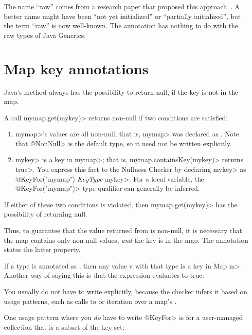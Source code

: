 The name ``raw'' comes from a research paper that proposed this
approach~\cite{FahndrichL2003}.
A better name might have been ``not yet initialized'' or ``partially
initialized'', but the term ``raw'' is now well-known.
The 
annotation has nothing to do with the raw types of Java Generics.


\section{Map key annotations\label{map-keys}}

Java's
method always has the possibility to return null, if the key is not in the
map.

A call \<mymap.get(mykey)> returns non-null if two conditions are satisfied:
\begin{enumerate}
\item \<mymap>'s values are all non-null; that is, \<mymap> was
  declared as .  Note
  that \<@NonNull> is the default type, so it need not be written explicitly.
\item \<mykey> is a key in \<mymap>; that is, \<mymap.containsKey(mykey)>
  returns \<true>.  You express this fact to the Nullness Checker by
  declaring \<mykey> as \<@KeyFor("mymap") \emph{KeyType} mykey>.  For a
  local variable, the \<@KeyFor("mymap")> type qualifier can generally be
  inferred.
\end{enumerate}
\noindent
If either of these two conditions is violated, then \<mymap.get(mykey)> has
the possibility of returning null.


  Thus, to guarantee that the value returned from  is
non-null, it is necessary that the map contains only non-null values,
\emph{and} the key is in the map.
The  annotation states the latter
property.

If a type is annotated as , then any value v with that type
is a key in Map \<m>.  Another way of saying this is that the expression
 evaluates to true.

You usually do not have to write  explicitly, because the
checker infers it based on usage patterns, such as calls to
 or iteration over a map's
.

One usage pattern where you \emph{do} have to write \<@KeyFor> is for a
user-managed collection that is a subset of the key set:

